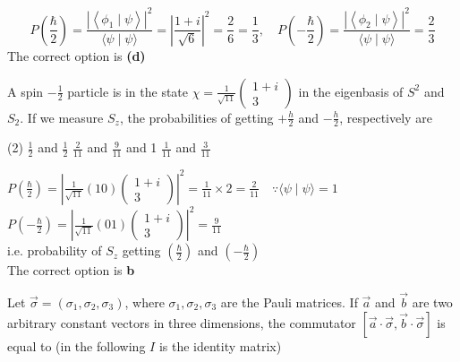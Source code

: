 \begin{enumerate}
\begin{answer}
$$
P\left(\frac{\hbar}{2}\right)=\frac{\left|\left\langle\phi_{1} \mid \psi\right\rangle\right|^{2}}{\langle\psi \mid \psi\rangle}=\left|\frac{1+i}{\sqrt{6}}\right|^{2}=\frac{2}{6}=\frac{1}{3}, \quad P\left(-\frac{\hbar}{2}\right)=\frac{\left|\left\langle\phi_{2} \mid \psi\right\rangle\right|^{2}}{\langle\psi \mid \psi\rangle}=\frac{2}{3}
$$
The correct option is \textbf{(d)}	
\end{answer}
\begin{minipage}{\textwidth}
	\item A spin $-\frac{1}{2}$ particle is in the state $\chi=\frac{1}{\sqrt{11}}\left(\begin{array}{c}1+i \\ 3\end{array}\right)$ in the eigenbasis of $S^{2}$ and $S_{2}$. If we measure $S_{z}$, the probabilities of getting $+\frac{h}{2}$ and $-\frac{h}{2}$, respectively are
\end{minipage}
\begin{tasks}(2)
	\task[\textbf{A.}] $\frac{1}{2}$ and $\frac{1}{2}$
	\task[\textbf{B.}]$\frac{2}{11}$ and $\frac{9}{11}$
	 and 1
	\task[\textbf{D.}]$\frac{1}{11}$ and $\frac{3}{11}$
\end{tasks}
\begin{answer}
	$P\left(\frac{\hbar}{2}\right)=\left|\frac{1}{\sqrt{11}}(10)\left(\begin{array}{c}1+i \\ 3\end{array}\right)\right|^{2}=\frac{1}{11} \times 2=\frac{2}{11} \quad \because\langle\psi \mid \psi\rangle=1$\\ $P\left(-\frac{\hbar}{2}\right)=\left|\frac{1}{\sqrt{11}}(01)\left(\begin{array}{c}1+i \\ 3\end{array}\right)\right|^{2}=\frac{9}{11}$\\
	i.e. probability of $S_{z}$ getting $\left(\frac{\hbar}{2}\right)$ and $\left(-\frac{\hbar}{2}\right)$\\
	The correct option is \textbf{b}
\end{answer}
\begin{minipage}{\textwidth}
\item Let $\vec{\sigma}=\left(\sigma_{1}, \sigma_{2}, \sigma_{3}\right)$, where $\sigma_{1}, \sigma_{2}, \sigma_{3}$ are the Pauli matrices. If $\vec{a}$ and $\vec{b}$ are two arbitrary constant vectors in three dimensions, the commutator $[\vec{a} \cdot \vec{\sigma}, \vec{b} \cdot \vec{\sigma}]$ is equal to (in the following $I$ is the identity matrix)

\end{minipage}
\end{enumerate}
